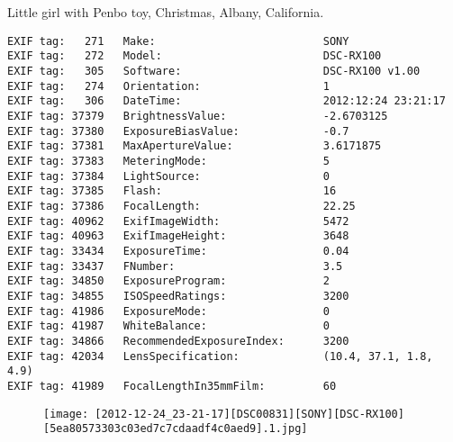 \section{\protect{}}
\noindent Little girl with Penbo toy, Christmas, Albany, California.
\noindent
\begin{lstlisting}
EXIF tag:   271   Make:                          SONY
EXIF tag:   272   Model:                         DSC-RX100
EXIF tag:   305   Software:                      DSC-RX100 v1.00
EXIF tag:   274   Orientation:                   1
EXIF tag:   306   DateTime:                      2012:12:24 23:21:17
EXIF tag: 37379   BrightnessValue:               -2.6703125
EXIF tag: 37380   ExposureBiasValue:             -0.7
EXIF tag: 37381   MaxApertureValue:              3.6171875
EXIF tag: 37383   MeteringMode:                  5
EXIF tag: 37384   LightSource:                   0
EXIF tag: 37385   Flash:                         16
EXIF tag: 37386   FocalLength:                   22.25
EXIF tag: 40962   ExifImageWidth:                5472
EXIF tag: 40963   ExifImageHeight:               3648
EXIF tag: 33434   ExposureTime:                  0.04
EXIF tag: 33437   FNumber:                       3.5
EXIF tag: 34850   ExposureProgram:               2
EXIF tag: 34855   ISOSpeedRatings:               3200
EXIF tag: 41986   ExposureMode:                  0
EXIF tag: 41987   WhiteBalance:                  0
EXIF tag: 34866   RecommendedExposureIndex:      3200
EXIF tag: 42034   LensSpecification:             (10.4, 37.1, 1.8, 4.9)
EXIF tag: 41989   FocalLengthIn35mmFilm:         60

\end{lstlisting}
\clearpage
\begin{figure}
\raggedleft
\texttt{[image: [2012-12-24\_23-21-17][DSC00831][SONY][DSC-RX100][5ea80573303c03ed7c7cdaadf4c0aed9].1.jpg]}
\end{figure}


\clearpage
